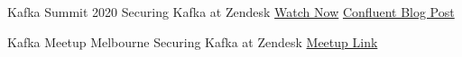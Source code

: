 

\begin{cventries}

  \cventry
    {Kafka Summit 2020} %
    {Securing Kafka at Zendesk} %
    {
      \href{https://www.confluent.io/resources/kafka-summit-2020/securing-kafka-at-zendesk/}{Watch Now}
    } %
    {
    }
    {
      \href{https://www.confluent.io/blog/how-zendesk-secures-kafka-with-mtls-authentication-system/}{\color{blue}Confluent Blog Post}
    } %

  \cventry
    {Kafka Meetup Melbourne} %
    {Securing Kafka at Zendesk} %
    {
      \href{https://www.meetup.com/KafkaMelbourne/events/268710832//}{Meetup Link}
    } %
    {
    }
    {
    } %
    

\end{cventries}
